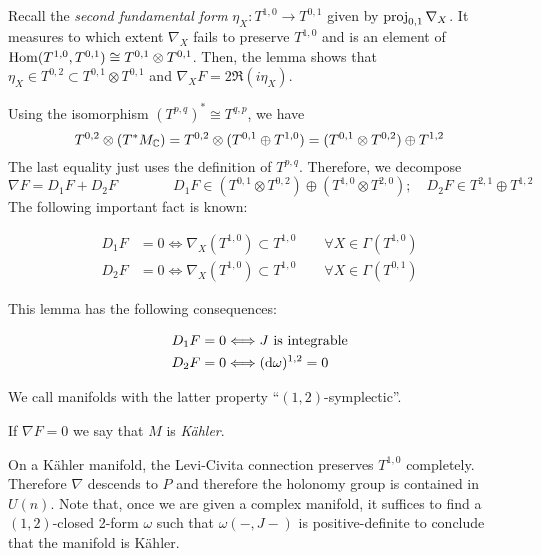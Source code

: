 \documentclass{scrartcl}
\begin{document}
Recall the \emph{second fundamental form} $\eta_X:T^{1,0}\to T^{0,1}$ given by $\operatorname{proj}_{0,1}\nabla_X$. It measures to which extent $\nabla_X$ fails to preserve $T^{1,0}$ and is an element of $\operatorname{Hom}(T^{1,0},T^{0,1})\cong T^{0,1}\otimes T^{0,1}$. Then, the lemma shows that $\eta_X\in T^{0,2}\subset T^{0,1}\otimes T^{0,1}$ and $\nabla_XF=2\Re(i\eta_X)$.
\medskip


Using the isomorphism $(T^{p,q})^*\cong T^{q,p}$, we have
\begin{equation*}
T^{0,2}\otimes (T^*M_{\mathbb{C}})=T^{0,2}\otimes (T^{0,1}\oplus T^{1,0})
=(T^{0,1}\otimes T^{0,2})\oplus T^{1,2}
\end{equation*}
The last equality just uses the definition of $T^{p,q}$. Therefore, we decompose
\begin{equation*}
\nabla F=D_1 F+D_2 F \qquad \qquad D_1F\in (T^{0,1}\otimes T^{0,2})\oplus(T^{1,0}\otimes T^{2,0});\quad 
D_2F\in T^{2,1}\oplus T^{1,2}
\end{equation*}
The following important fact is known:

\begin{lem}
	\begin{align*}
	D_1F&=0\Longleftrightarrow \nabla_X(T^{1,0})\subset T^{1,0} \qquad \forall X\in\Gamma(T^{1,0}) \\
	D_2F&=0\Longleftrightarrow \nabla_X(T^{1,0})\subset T^{1,0} \qquad \forall X\in\Gamma(T^{0,1})
	\end{align*}
\end{lem}

This lemma has the following consequences:

\begin{prop}
	\begin{align*}
	D_1F&=0\Longleftrightarrow J\text{ is integrable}\\
	D_2F&=0\Longleftrightarrow (\mathrm{d}\omega)^{1,2}=0
	\end{align*}
\end{prop}

\begin{rem}
	We call manifolds with the latter property ``$(1,2)$-symplectic''.
\end{rem}

\begin{mydef}
	If $\nabla F=0$ we say that $M$ is \emph{K\"{a}hler}.
\end{mydef}

On a K\"{a}hler manifold, the Levi-Civita connection preserves $T^{1,0}$ completely. Therefore $\nabla$ descends to $P$ and therefore the holonomy group is contained in $U(n)$. Note that, once we are given a complex manifold, it suffices to find a $(1,2)$-closed 2-form $\omega$ such that $\omega(-,J-)$ is positive-definite to conclude that the manifold is K\"{a}hler.
\end{document}
